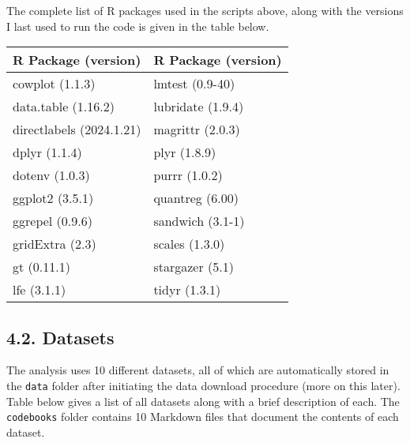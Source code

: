 \documentclass[10pt]{article}
\newenvironment{eightpt}{\begingroup\fontsize{8}{13}\selectfont}{\endgroup}
\begin{document}
The complete list of R packages used in the scripts above, along with the versions I last used to run the code is given in the table below.

\begin{eightpt}
\begin{tabularx}{\textwidth}{TT}
\toprule
R Package (version) & R Package (version) \\
\midrule
cowplot (1.1.3)          & lmtest (0.9-40)           \\
data.table (1.16.2)      & lubridate (1.9.4)         \\
directlabels (2024.1.21) & magrittr (2.0.3)          \\
dplyr (1.1.4)            & plyr (1.8.9)              \\
dotenv (1.0.3)           & purrr (1.0.2)             \\
ggplot2 (3.5.1)          & quantreg (6.00)           \\
ggrepel (0.9.6)          & sandwich (3.1-1)          \\
gridExtra (2.3)          & scales (1.3.0)            \\
gt (0.11.1)              & stargazer (5.1)           \\
lfe (3.1.1)              & tidyr (1.3.1)             \\
\bottomrule
\end{tabularx}
\end{eightpt}

\subsection*{4.2. Datasets}

The analysis uses 10 different datasets, all of which are automatically stored in the \texttt{data} folder after initiating the data download procedure (more on this later).
Table below gives a list of all datasets along with a brief description of each.
The \texttt{codebooks} folder contains 10 Markdown files that document the contents of each dataset.
\end{document}
